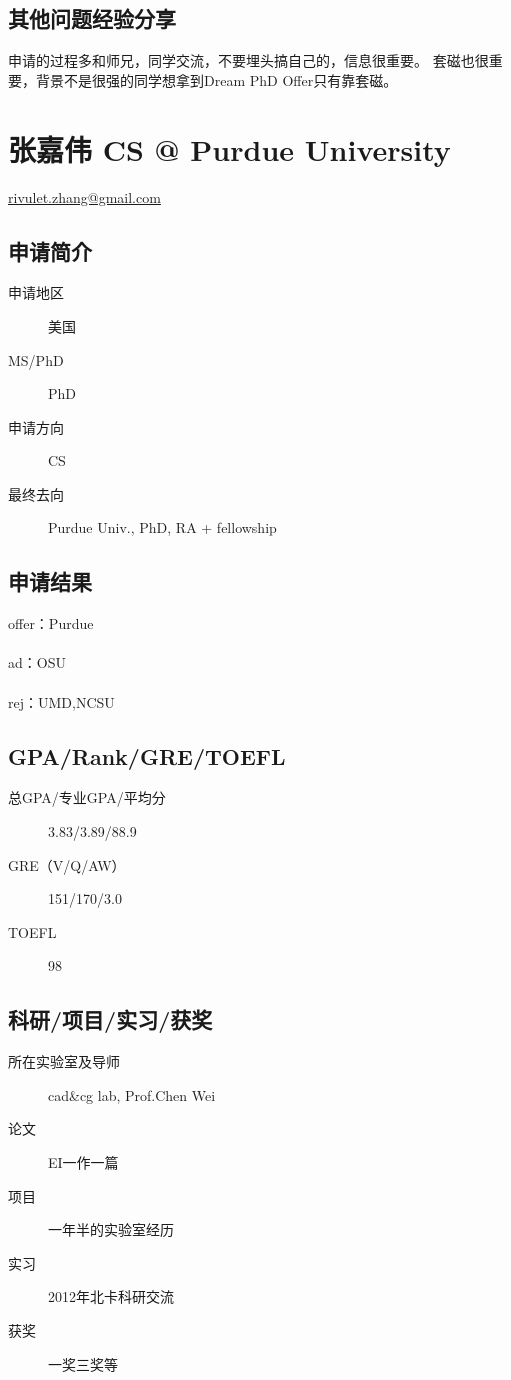 \documentclass[11pt,fleqn,openany]{book} %
\begin{document}
\subsection*{其他问题经验分享}
申请的过程多和师兄，同学交流，不要埋头搞自己的，信息很重要。
套磁也很重要，背景不是很强的同学想拿到Dream PhD Offer只有靠套磁。
\clearpage
\section{张嘉伟 CS @ Purdue University}
\hfill \href{mailto:rivulet.zhang@gmail.com}{rivulet.zhang@gmail.com}

\noindent\begin{minipage}[t]{0.45\textwidth}
\subsection*{申请简介}
\begin{description}
\item[申请地区] 美国
\item[MS/PhD] PhD
\item[申请方向] CS
\item[最终去向] Purdue Univ., PhD, RA + fellowship
\end{description}
\end{minipage}
\hfill
\begin{minipage}[t]{0.45\textwidth}
\subsection*{申请结果}
\noindent offer：Purdue\\
\\
ad：OSU\\
\\
rej：UMD,NCSU
\end{minipage}
\subsection*{GPA/Rank/GRE/TOEFL}
\begin{description}
\item[总GPA/专业GPA/平均分] 3.83/3.89/88.9
\item[GRE（V/Q/AW）] 151/170/3.0
\item[TOEFL] 98
\end{description}

\subsection*{科研/项目/实习/获奖}
\begin{description}
\item[所在实验室及导师] cad\&cg lab, Prof.Chen Wei
\item[论文] EI一作一篇
\item[项目] 一年半的实验室经历
\item[实习] 2012年北卡科研交流
\item[获奖] 一奖三奖等
\end{description}
\end{document}
